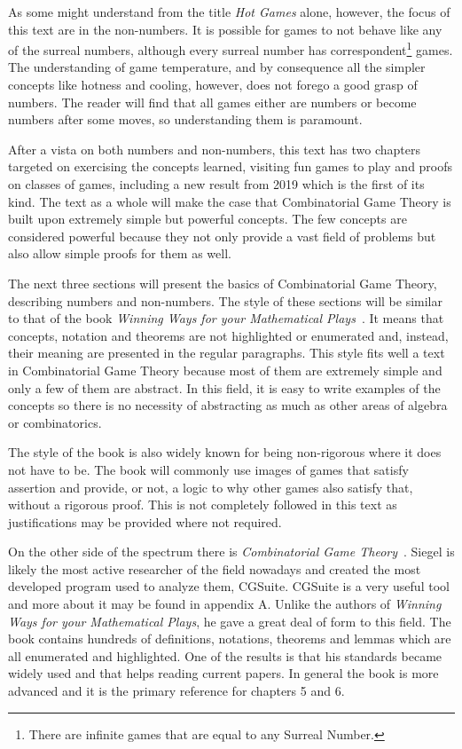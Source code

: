 As some might understand from the title \textit{Hot Games} alone, however, the focus of this text are in the non-numbers. It is possible for games to not behave like any of the surreal numbers, although every surreal number has correspondent\footnote{There are infinite games that are equal to any Surreal Number.} games. The understanding of game temperature, and by consequence all the simpler concepts like hotness and cooling, however, does not forego a good grasp of numbers. The reader will find that all games either are numbers or become numbers after some moves, so understanding them is paramount.

After a vista on both numbers and non-numbers, this text has two chapters targeted on exercising the concepts learned, visiting fun games to play and proofs on classes of games, including a new result from 2019 which is the first of its kind. The text as a whole will make the case that Combinatorial Game Theory is built upon extremely simple but powerful concepts. The few concepts are considered powerful because they not only provide a vast field of problems but also allow simple proofs for them as well.

The next three sections will present the basics of Combinatorial Game Theory, describing numbers and non-numbers. The style of these sections will be similar to that of the book \textit{Winning Ways for your Mathematical Plays}~\cite{WW}. It means that concepts, notation and theorems are not highlighted or enumerated and, instead, their meaning are presented in the regular paragraphs. This style fits well a text in Combinatorial Game Theory because most of them are extremely simple and only a few of them are abstract. In this field, it is easy to write examples of the concepts so there is no necessity of abstracting as much as other areas of algebra or combinatorics.

The style of the book is also widely known for being non-rigorous where it does not have to be. The book will commonly use images of games that satisfy assertion and provide, or not, a logic to why other games also satisfy that, without a rigorous proof. This is not completely followed in this text as justifications may be provided where not required. 

On the other side of the spectrum there is \textit{Combinatorial Game Theory}~\cite{CGT}. Siegel is likely the most active researcher of the field nowadays and created the most developed program used to analyze them, CGSuite. CGSuite is a very useful tool and more about it may be found in appendix A. Unlike the authors of \textit{Winning Ways for your Mathematical Plays}, he gave a great deal of form to this field. The book contains hundreds of definitions, notations, theorems and lemmas which are all enumerated and highlighted. One of the results is that his standards became widely used and that helps reading current papers. In general the book is more advanced and it is the primary reference for chapters 5 and 6.

